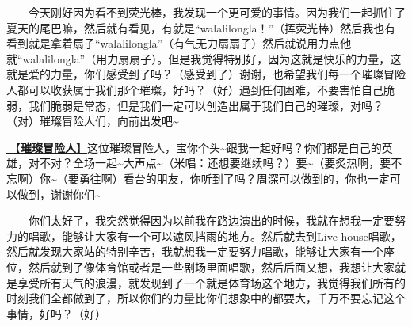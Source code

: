 \documentclass[]{ctexbook}
\begin{document}
  今天刚好因为看不到荧光棒，我发现一个更可爱的事情。因为我们一起抓住了夏天的尾巴嘛，然后就有看见，有就是``walalilongla！''（挥荧光棒）然后我也有看到就是拿着扇子``walalilongla''（有气无力扇扇子）然后就说用力点他就``walalilongla''（用力扇扇子）。但是我觉得特别好，因为这就是快乐的力量，这就是爱的力量，你们感受到了吗？（感受到了）谢谢，也希望我们每一个璀璨冒险人都可以收获属于我们那个璀璨，好吗？（好）遇到任何困难，不要害怕自己脆弱，我们脆弱是常态，但是我们一定可以创造出属于我们自己的璀璨，对吗？（对）璀璨冒险人们，向前出发吧\textasciitilde{}

\hyperref[adventurers]{🎵【\textbf{璀璨冒险人}】}这位璀璨冒险人，宝你个头\textasciitilde 跟我一起好吗？你们都是自己的英雄，对不对？全场一起\textasciitilde 大声点\textasciitilde（米唱：还想要继续吗？）要\textasciitilde（要炙热啊，要不忘啊）你\textasciitilde（要勇往啊）看台的朋友，你听到了吗？周深可以做到的，你也一定可以做到，谢谢你们\textasciitilde{}

  你们太好了，我突然觉得因为以前我在路边演出的时候，我就在想我一定要努力的唱歌，能够让大家有一个可以遮风挡雨的地方。然后就去到Live house唱歌，然后就发现大家站的特别辛苦，我就想我一定要努力唱歌，能够让大家有一个座位，然后就到了像体育馆或者是一些剧场里面唱歌，然后后面又想，我想让大家就是享受所有天气的浪漫，就发现到了一个就是体育场这个地方，我觉得我们所有的时刻我们全都做到了，所以你们的力量比你们想象中的都要大，千万不要忘记这个事情，好吗？（好）
\end{document}
